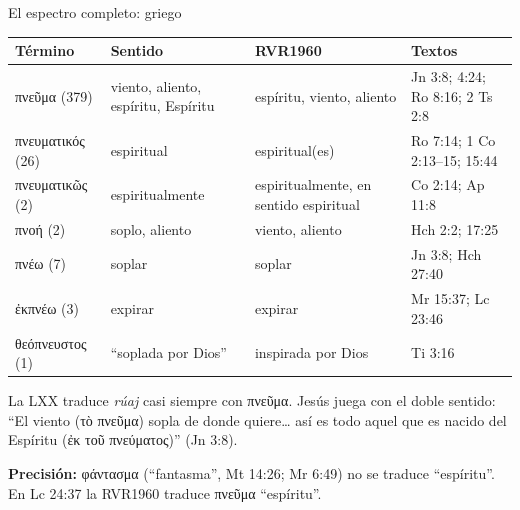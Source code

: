 \documentclass[hyperref={bookmarks=false},aspectratio=169]{beamer}
\newcommand{\grc}[1]{\foreignlanguage{ancientgreek}{#1}}
\newcommand{\precision}[1]{{\footnotesize\color{gris}\textbf{Precisión:} #1}}
\begin{document}
\begin{frame}{El espectro completo: griego}
\scriptsize\renewcommand{\arraystretch}{1.12}
\begin{tabular}{@{}>{\RaggedRight\arraybackslash}p{2.7cm}>{\RaggedRight\arraybackslash}p{3.1cm}>{\RaggedRight\arraybackslash}p{2.9cm}>{\RaggedRight\arraybackslash}p{3.1cm}@{}}
\toprule
\textbf{Término} & \textbf{Sentido} & \textbf{RVR1960} & \textbf{Textos} \\ \midrule
\grc{πνεῦμα} (379) & viento, aliento, espíritu, Espíritu & espíritu, viento, aliento & Jn 3:8; 4:24; Ro 8:16; 2 Ts 2:8 \\
\grc{πνευματικός} (26) & espiritual & espiritual(es) & Ro 7:14; 1 Co 2:13--15; 15:44 \\
\grc{πνευματικῶς} (2) & espiritualmente & espiritualmente, en sentido espiritual & 1 Co 2:14; Ap 11:8 \\
\grc{πνοή} (2) & soplo, aliento & viento, aliento & Hch 2:2; 17:25 \\
\grc{πνέω} (7) & soplar & soplar & Jn 3:8; Hch 27:40 \\
\grc{ἐκπνέω} (3) & expirar & expirar & Mr 15:37; Lc 23:46 \\
\grc{θεόπνευστος} (1) & ``soplada por Dios'' & inspirada por Dios & 2 Ti 3:16 \\
\bottomrule
\end{tabular}\par\medskip
\small\RaggedRight La LXX traduce \emph{rúaj} casi siempre con \grc{πνεῦμα}. Jesús juega con el doble sentido: ``El viento (\grc{τὸ πνεῦμα}) sopla de donde quiere\ldots{} así es todo aquel que es nacido del Espíritu (\grc{ἐκ τοῦ πνεύματος})'' (Jn 3:8).\par\smallskip
\precision{\grc{φάντασμα} (``fantasma'', Mt 14:26; Mr 6:49) no se traduce ``espíritu''. En Lc 24:37 la RVR1960 traduce \grc{πνεῦμα} ``espíritu''.}
\end{frame}
\end{document}
